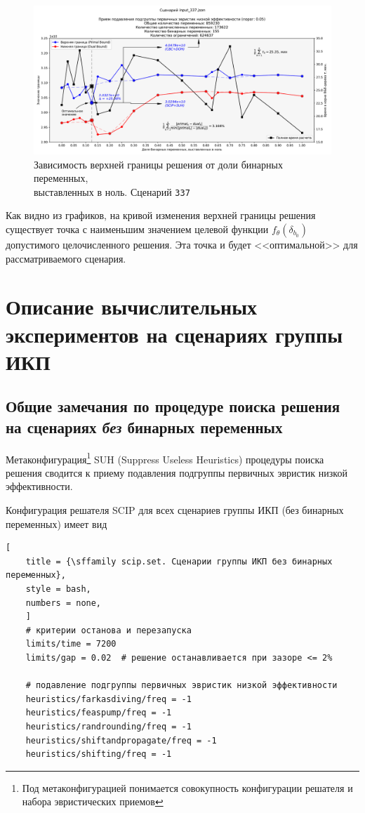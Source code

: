 \documentclass[%
	11pt,
	a4paper,
	utf8,
		]{article}
\begin{document}
\begin{figure}[!h]
	\centering
	\includegraphics[scale=0.45]{figures/337_frac_bin_zeros.pdf}
	\caption{ Зависимость верхней границы решения от доли бинарных переменных, \\выставленных в ноль. Сценарий \texttt{337} }\label{fig:337fracbinzeros}
\end{figure}

Как видно из графиков, на кривой изменения верхней границы решения существует точка с наименьшим значением целевой функции $ f_{\theta}(\delta_{b_0}) $ допустимого целочисленного решения. Эта точка и будет <<оптимальной>> для рассматриваемого сценария.

\section{Описание вычислительных экспериментов на сценариях группы ИКП}

\subsection{Общие замечания по процедуре поиска решения на сценариях \emph{без} бинарных переменных}

Метаконфигурация\footnote{Под метаконфигурацией понимается совокупность конфигурации решателя и набора эвристических приемов} SUH (Suppress Useless Heuristics) процедуры поиска решения сводится к приему подавления подгруппы первичных эвристик низкой эффективности.


Конфигурация решателя SCIP для всех сценариев группы ИКП (без бинарных переменных) имеет вид
\begin{lstlisting}[
	title = {\sffamily scip.set. Сценарии группы ИКП без бинарных переменных},
	style = bash,
	numbers = none,
	]
	# критерии останова и перезапуска
	limits/time = 7200
	limits/gap = 0.02  # решение останавливается при зазоре <= 2%
	
	# подавление подгруппы первичных эвристик низкой эффективности
	heuristics/farkasdiving/freq = -1
	heuristics/feaspump/freq = -1
	heuristics/randrounding/freq = -1
	heuristics/shiftandpropagate/freq = -1
	heuristics/shifting/freq = -1
\end{lstlisting}
\end{document}
